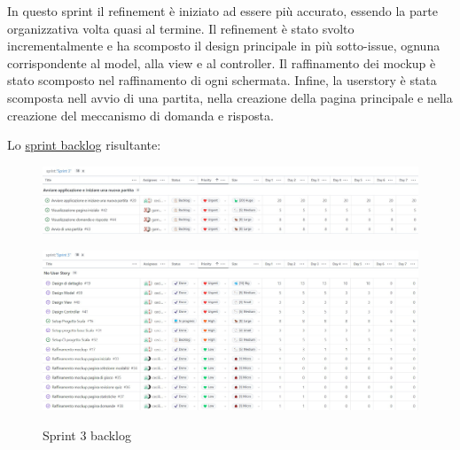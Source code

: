 In questo sprint il refinement è iniziato ad essere più accurato, essendo la parte organizzativa volta quasi al termine. Il refinement è stato svolto incrementalmente e ha scomposto il design principale in più sotto-issue, ognuna corrispondente al model, alla view e al controller. Il raffinamento dei mockup è stato scomposto nel raffinamento di ogni schermata.  Infine, la userstory è stata scomposta nell avvio di una partita, nella creazione della pagina principale e nella creazione del meccanismo di domanda e risposta. 

Lo \href{https://github.com/orgs/ISIQuiz/projects/3/views/14}{sprint backlog} risultante:

\begin{figure}[H]
    \centering
    \includegraphics[width=\textwidth]{process/Img/Sprint3BL1.jpg}
    \label{fig:Sprint3BL1}
\end{figure}
\begin{figure}[H]
    \centering
    \includegraphics[width=\textwidth]{process/Img/Sprint3BL2.jpg}
    \label{fig:Sprint3BL2}
    \caption{Sprint 3 backlog}
\end{figure}
